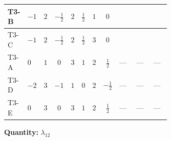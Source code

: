 \documentclass[8pt]{article}
\begin{document}
\begin{landscape}
\begin{longtable}{@{}llcccccc >{\raggedright\arraybackslash}p{0.21\linewidth} >{\raggedright\arraybackslash}p{0.21\linewidth} >{\raggedright\arraybackslash}p{0.21\linewidth}@{}}
T3-B & $-1$ & $2$ & $-\frac{1}{2}$ & $2$ & $\frac{1}{2}$ & $1$ & $0$ & \scriptsize\adjustbox{max width=\linewidth}{$\begin{gathered} {\lambda_{HS_1}^{(1)}} \left(\frac{1}{2} \operatorname{Tr}\!\left({y_2}\,\left({y_1}\right)^{\dagger}\right)+4 {\lambda_{H H^\dagger S_1^\dagger S_2^\dagger}^{\rm Cross}}+3 {\lambda_{11}}\right)\end{gathered}$} & \scriptsize\adjustbox{max width=\linewidth}{$\begin{gathered} +{\lambda_{HS_1}^{(A)}} \left(-\frac{1}{8} \operatorname{Tr}\!\left({y_2}\,\left({y_1}\right)^{\dagger}\right)-\frac{{\lambda_{H H^\dagger S_1^\dagger S_2^\dagger}^{\rm Cross}}}{2}-\frac{{\lambda_{11}}}{4}\right)\end{gathered}$} & \scriptsize\adjustbox{max width=\linewidth}{$\begin{gathered} +{\lambda_{HS_2}^{(1)}} \left(\frac{1}{2} \operatorname{Tr}\!\left({y_2}\,\left({y_1}\right)^{\dagger}\right)+4 {\lambda_{H H^\dagger S_1^\dagger S_2^\dagger}^{\rm Cross}}+3 {\lambda_{10}}\right)\end{gathered}$} \\
\midrule
T3-C & $-1$ & $2$ & $-\frac{1}{2}$ & $2$ & $\frac{1}{2}$ & $3$ & $0$ & \scriptsize\adjustbox{max width=\linewidth}{$\begin{gathered} {\lambda_{HS_1}^{(1)}} \left(\frac{3}{4} \operatorname{Tr}\!\left({y_2}\,\left({y_1}\right)^{\dagger}\right)+4 {\lambda_{H H^\dagger S_1^\dagger S_2^\dagger}^{\rm Cross}}+3 {\lambda_{11}}\right)\end{gathered}$} & \scriptsize\adjustbox{max width=\linewidth}{$\begin{gathered} +{\lambda_{HS_1}^{(A)}} \left(-\frac{3}{16} \operatorname{Tr}\!\left({y_2}\,\left({y_1}\right)^{\dagger}\right)-\frac{{\lambda_{H H^\dagger S_1^\dagger S_2^\dagger}^{\rm Cross}}}{2}-\frac{{\lambda_{11}}}{4}\right)\end{gathered}$} & \scriptsize\adjustbox{max width=\linewidth}{$\begin{gathered} +{\lambda_{HS_2}^{(1)}} \left(\frac{3}{4} \operatorname{Tr}\!\left({y_2}\,\left({y_1}\right)^{\dagger}\right)+4 {\lambda_{H H^\dagger S_1^\dagger S_2^\dagger}^{\rm Cross}}+3 {\lambda_{10}}\right)\end{gathered}$} \\
\midrule
T3-A & $0$ & $1$ & $0$ & $3$ & $1$ & $2$ & $\frac{1}{2}$ & --- & --- & --- \\
\midrule
T3-D & $-2$ & $3$ & $-1$ & $1$ & $0$ & $2$ & $-\frac{1}{2}$ & --- & --- & --- \\
\midrule
T3-E & $0$ & $3$ & $0$ & $3$ & $1$ & $2$ & $\frac{1}{2}$ & --- & --- & --- \\
\midrule
\bottomrule
\end{longtable}
\clearpage
\noindent\textbf{Quantity: }$\lambda_{12}$\par\smallskip

\end{landscape}
\end{document}
